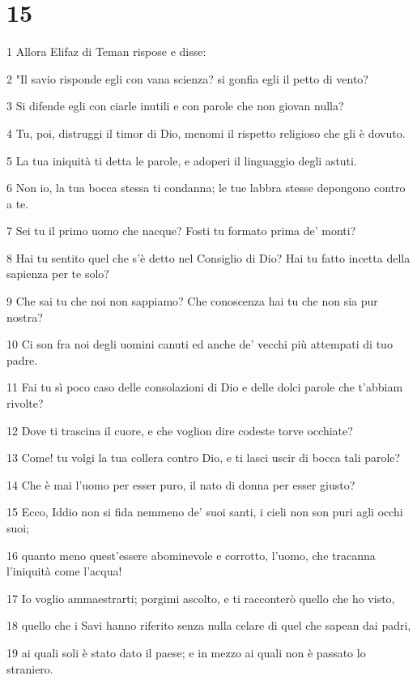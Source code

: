 \chapter{15}

\par 1 Allora Elifaz di Teman rispose e disse:
\par 2 "Il savio risponde egli con vana scienza? si gonfia egli il petto di vento?
\par 3 Si difende egli con ciarle inutili e con parole che non giovan nulla?
\par 4 Tu, poi, distruggi il timor di Dio, menomi il rispetto religioso che gli è dovuto.
\par 5 La tua iniquità ti detta le parole, e adoperi il linguaggio degli astuti.
\par 6 Non io, la tua bocca stessa ti condanna; le tue labbra stesse depongono contro a te.
\par 7 Sei tu il primo uomo che nacque? Fosti tu formato prima de' monti?
\par 8 Hai tu sentito quel che s'è detto nel Consiglio di Dio? Hai tu fatto incetta della sapienza per te solo?
\par 9 Che sai tu che noi non sappiamo? Che conoscenza hai tu che non sia pur nostra?
\par 10 Ci son fra noi degli uomini canuti ed anche de' vecchi più attempati di tuo padre.
\par 11 Fai tu sì poco caso delle consolazioni di Dio e delle dolci parole che t'abbiam rivolte?
\par 12 Dove ti trascina il cuore, e che voglion dire codeste torve occhiate?
\par 13 Come! tu volgi la tua collera contro Dio, e ti lasci uscir di bocca tali parole?
\par 14 Che è mai l'uomo per esser puro, il nato di donna per esser giusto?
\par 15 Ecco, Iddio non si fida nemmeno de' suoi santi, i cieli non son puri agli occhi suoi;
\par 16 quanto meno quest'essere abominevole e corrotto, l'uomo, che tracanna l'iniquità come l'acqua!
\par 17 Io voglio ammaestrarti; porgimi ascolto, e ti racconterò quello che ho visto,
\par 18 quello che i Savi hanno riferito senza nulla celare di quel che sapean dai padri,
\par 19 ai quali soli è stato dato il paese; e in mezzo ai quali non è passato lo straniero.
